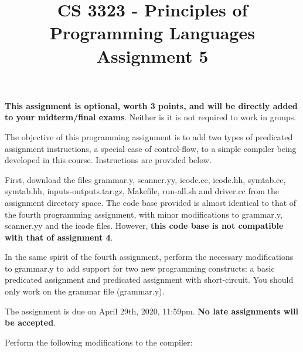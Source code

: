 \documentclass[letter,10pt]{article}
\title{CS 3323 - Principles of Programming Languages\\ Assignment 5}
\date{}
\begin{document}
\maketitle

{\bf This assignment is optional, worth 3 points, and will be directly added
to your midterm/final exams}. Neither is it is not required to work in groups.

The objective of this programming assignment is to add two types of predicated 
assignment instructions, a special case of control-flow,
to a simple compiler being developed in this course. Instructions are provided below.

First, download the files 
grammar.y, scanner.yy, icode.cc, icode.hh, symtab.cc, symtab.hh, inputs-outputs.tar.gz, Makefile, run-all.sh and driver.cc 
from the assignment directory space. 
The code base provided is almost identical to that of the fourth programming assignment, with minor
modifications to grammar.y, scanner.yy and the icode files. However, {\bf this code base is not compatible
with that of assignment 4}.

In the same spirit of the fourth assignment, perform the necessary modifications
to grammar.y to add support for two new programming constructs: a basic predicated assignment and predicated assignment with short-circuit.
You should only work on the grammar file (grammar.y).

The assignment is due on April 29th, 2020, 11:59pm. {\bf No late assignments will be accepted}.

Perform the following modifications to the compiler:
\end{document}
